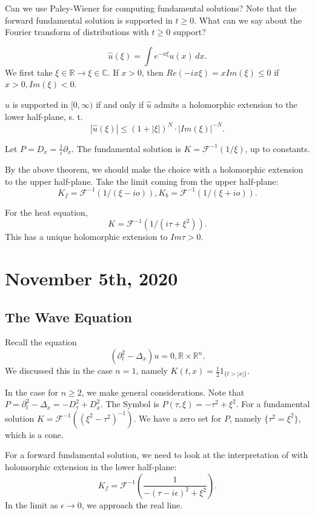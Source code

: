 \documentclass[11pt]{scrartcl}
\newcommand{\R}{\mathbb{R}}
\newcommand{\C}{\mathbb C}
\renewcommand{\hat}{\widehat}
\begin{document}
Can we use Paley-Wiener for computing fundamental solutions?  Note that the forward fundamental solution is supported in $t \ge 0$.  What can we say about the Fourier transform of distributions with $t\ge 0$ support?  

$$\hat{u}(\xi) = \int e^{-x\xi}u(x)\, dx.$$
We first take $\xi \in \R \to \xi \in \C$.  If $x > 0$, then $Re(-ix\xi) = x Im(\xi) \le 0$ if $x >0, Im(\xi) < 0$.

\begin{thm} $u$ is supported in $[0, \infty)$ if and only if $\hat{u}$ admits a holomorphic extension to the lower half-plane, s. t. 
$$|\hat{u}(\xi)| \le (1 + |\xi|)^N \cdot |Im(\xi)|^{-N}.$$
\end{thm}
\begin{example} Let $P = D_x = \frac{1}{i}\partial_x$.  The fundamental solution is $K = \mathcal F^{-1}(1/\xi)$, up to constants.  

By the above theorem, we should make the choice with a holomorphic extension to the upper half-plane.  Take the limit coming from the upper half-plane:
$$K_f = \mathcal{F}^{-1} (1/(\xi - io)), K_b = \mathcal{F}^{-1}(1/(\xi + io)).$$
\end{example}
\begin{example}
For the heat equation,
$$K = \mathcal{F}^{-1} (1/(i\tau + \xi^2)). $$
This has a unique holomorphic extension to $Im \tau > 0$.
\end{example}
\pagebreak
\section{November 5th, 2020}
\subsection{The Wave Equation}
Recall the equation
$$(\partial_t^2 - \Delta_x) u = 0, \R \times \R^n.$$
We discussed this in the case $n=1$, namely $K(t, x) = \frac{1}{2}1_{\{t > |x|\}}.$

In the case for $n \ge 2$, we make general considerations.  Note that $P = \partial_t^2 - \Delta_x = -D_\tau^2 + D_x^2$.  The Symbol is $P(\tau, \xi) = -\tau^2 + \xi^2$.  For a fundamental solution $K = \mathcal F^{-1}((\xi^2 - \tau^2)^{-1}).$  We have a zero set for $P$, namely $\{\tau^2 = \xi^2\}$, which is a cone.  

For a forward fundamental solution, we need to look at the interpretation of with holomorphic extension in the lower half-plane:
$$K_f = \mathcal F^{-1}\left (\frac{1}{-(\tau - i\epsilon)^2 + \xi^2}\right).$$
In the limit as $\epsilon \to 0$, we approach the real line.
\end{document}
